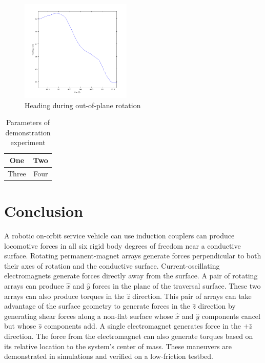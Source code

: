 \documentclass[letterpaper, 10 pt, conference]{ieeeconf}  %
\begin{document}
      
         \begin{figure}[thpb]
      \centering
      \includegraphics[width = 0.47\textwidth]{figures/rotation_heading.tif}
      \caption{Heading during out-of-plane rotation}
      \label{fig:ooprotation}
   \end{figure}

  

\begin{table}[h]
\caption{Parameters of demonstration experiment}
\label{table:params}
\begin{center}
\begin{tabular}{|c||c|}
\hline
One & Two\\
\hline
Three & Four\\
\hline
\end{tabular}
\end{center}
\end{table}

\section{Conclusion}
A robotic on-orbit service vehicle can use induction couplers can produce locomotive forces in all six rigid body degrees of freedom near a conductive surface. Rotating permanent-magnet arrays generate forces perpendicular to both their axes of rotation and the conductive surface. Current-oscillating electromagnets generate forces directly away from the surface. A pair of rotating arrays can produce $\hat{x}$ and $\hat{y}$ forces in the plane of the traversal surface. These two arrays can also produce torques in the $\hat{z}$ direction. This pair of arrays can take advantage of the surface geometry to generate forces in the $\hat{z}$ direction by generating shear forces along a non-flat surface whose $\hat{x}$ and $\hat{y}$ components cancel but whose $\hat{s}$ components add. A single electromagnet generates force in the $+\hat{z}$ direction. The force from the electromagnet can also generate torques based on its relative location to the system's center of mass. These maneuvers are demonstrated in simulations and verified on a low-friction testbed.  
\end{document}
